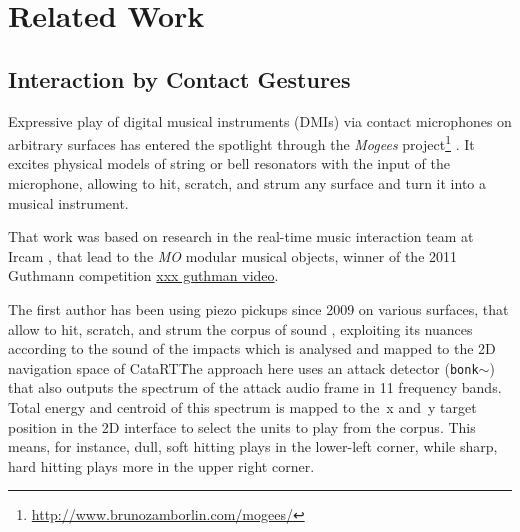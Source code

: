 \section{Related Work}

\newcommand{\name}     [1] {{\it #1}}
\newcommand{\strong}   [1] {{\bf #1}}
\newcommand{\progname} [1] {{\it #1}}  %
\newcommand{\sysname}  [1] {{\sc #1}}  %
\newcommand{\code}     [1] {{\tt #1}}

\newcommand{\cbcs}{corpus-based concatenative synthesis}
\newcommand{\Cbcs}{Corpus-based concatenative synthesis}
\newcommand{\CBCS}{Corpus-Based Concatenative Synthesis}
\newcommand{\catart}     {\sysname{CataRT}} %
\newcommand{\maxmsp}     {\sysname{Max/\hspace{0pt}MSP}}
\newcommand{\ftm}        {\sysname{FTM\&Co}}
\newcommand{\gabor}      {\sysname{Gabor}}

\subsection{Interaction by Contact Gestures}


Expressive play of digital musical instruments (DMIs) via contact microphones on arbitrary surfaces has entered the spotlight through the \name{Mogees} project\footnote{\url{http://www.brunozamborlin.com/mogees/}}  \cite{Zamborlin14a}.  It excites physical models of string or bell resonators with the input of the microphone, allowing to hit, scratch, and strum any surface and turn it into a musical instrument.  


That work was based on research in the real-time music interaction team at Ircam \cite{Rasamimanana11a,Bevilacqua11b,Zamborlin14a}, that lead to the \name{MO} modular musical objects, winner of the 2011 Guthmann competition \url{xxx guthman video}.


The first author has been using piezo pickups since 2009 on various surfaces, that allow to hit, scratch, and strum the corpus of sound \cite{Schwarz-nime2012-sound-space}, exploiting
its nuances according to the sound of the impacts which is analysed and mapped to
the 2D navigation space of \catart\.


The approach here uses an attack detector (\code{bonk$\sim$}) that also outputs the spectrum of the
attack audio frame in 11 frequency bands.  Total energy and centroid of this spectrum is mapped to
the~x and~y target position in the 2D interface to select the units to play from the corpus.
This means, for instance, dull, soft hitting plays in the lower-left corner, while sharp, hard hitting plays more in the upper right corner.


